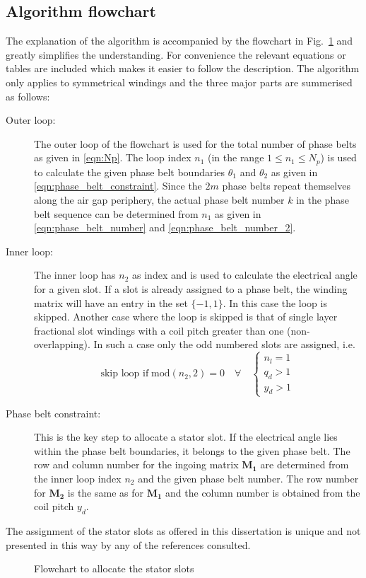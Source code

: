 \subsection{Algorithm flowchart}
The explanation of the algorithm is accompanied by the flowchart in Fig.~\ref{fig:flowchart} and greatly simplifies the understanding. For convenience the relevant equations or tables are included which makes it easier to follow the description. The algorithm only applies to symmetrical windings and the three major parts are summerised as follows:
\begin{description}
\item[Outer loop:] The outer loop of the flowchart is used for the total number of phase belts as given in \eqref{eqn:Np}. The loop index $n_1$ (in the range $1\leq n_1 \leq N_p$) is used to calculate the given phase belt boundaries $\theta_1$ and $\theta_2$ as given in \eqref{eqn:phase_belt_constraint}. Since the $2m$ phase belts repeat themselves along the air gap periphery, the actual phase belt number $k$ in the phase belt sequence can be determined from $n_1$ as given in \eqref{eqn:phase_belt_number} and \eqref{eqn:phase_belt_number_2}.
\item[Inner loop:] The inner loop has $n_2$ as index and is used to calculate the electrical angle for a given slot. If a slot is already assigned to a phase belt, the winding matrix will have an entry in the set $\{-1,1\}$. In this case the loop is skipped. Another case where the loop is skipped is that of single layer fractional slot windings with a coil pitch greater than one (non-overlapping). In such a case only the odd numbered slots are assigned, i.e.
\begin{equation}\label{eqn:modn20}
  \mbox{skip loop if} \; \mbox{mod}(n_2,2) = 0 
  \quad 
  \forall
  \quad
  \begin{cases}
    n_l = 1    \\
    q_d > 1    \\
    y_d > 1
  \end{cases}
\end{equation} 
\item[Phase belt constraint:] This is the key step to allocate a stator slot. If the electrical angle lies within the phase belt boundaries, it belongs to the given phase belt. The row and column number for the ingoing matrix $\mathbf{M_1}$ are determined from the inner loop index $n_2$ and the given phase belt number. The row number for $\mathbf{M_2}$ is the same as for $\mathbf{M_1}$ and the column number is obtained from the coil pitch $y_d$.
\end{description}
The assignment of the stator slots as offered in this dissertation is unique and not presented in this way by any of the references consulted. 
\begin{figure}
  \centering
  \fontsize{9}{10}\selectfont
  
  \caption{Flowchart to allocate the stator slots}
  \label{fig:flowchart}
\end{figure}

